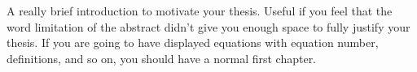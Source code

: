 A really brief introduction to motivate your thesis.  Useful if you
feel that the word limitation of the abstract didn't give you enough
space to fully justify your thesis.  If you are going to have
displayed equations with equation number, definitions, and so on, you
should have a normal first chapter.

